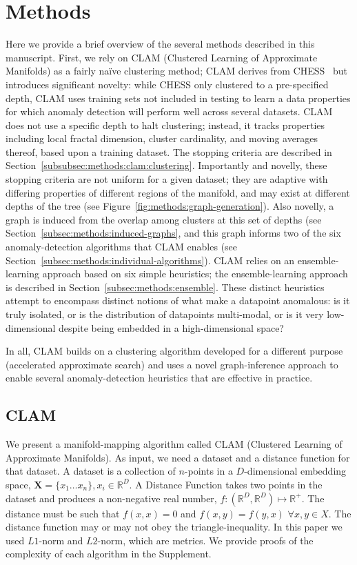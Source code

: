 \section{Methods}
\label{sec:methods}
\label{subsec:methods:overview}

Here we provide a brief overview of the several methods described in this manuscript.
First, we rely on CLAM (Clustered Learning of Approximate Manifolds) as a fairly na\"ive clustering method; CLAM derives from CHESS~\cite{ishaq2019clustered} but introduces significant novelty: while CHESS only clustered to a pre-specified depth, CLAM uses training sets not included in testing to learn a data properties for which anomaly detection will perform well across several datasets.
CLAM does not use a specific depth to halt clustering; instead, it tracks properties including local fractal dimension, cluster cardinality, and moving averages thereof, based upon a training dataset. 
The stopping criteria are described in Section~\ref{subsubsec:methods:clam:clustering}.
Importantly and novelly, these stopping criteria are not uniform for a given dataset; they are adaptive with differing properties of different regions of the manifold, and may exist at different depths of the tree (see Figure~\ref{fig:methods:graph-generation}).
Also novelly, a graph is induced from the overlap among clusters at this set of depths (see Section~\ref{subsec:methods:induced-graphs}, and this graph informs two of the six anomaly-detection algorithms that CLAM enables (see Section~\ref{subsec:methods:individual-algorithms}).
CLAM relies on an ensemble-learning approach based on six simple heuristics; the ensemble-learning approach is described in Section~\ref{subsec:methods:ensemble}.
These distinct heuristics attempt to encompass distinct notions of what make a datapoint anomalous: is it truly isolated, or is the distribution of datapoints multi-modal, or is it very low-dimensional despite being embedded in a high-dimensional space?

In all, CLAM builds on a clustering algorithm developed for a different purpose (accelerated approximate search) and uses a novel graph-inference approach to enable several anomaly-detection heuristics that are effective in practice.


\subsection{CLAM}
\label{subsec:methods:clam}

We present a manifold-mapping algorithm called CLAM (Clustered Learning of Approximate Manifolds).
As input, we need a dataset and a distance function for that dataset.
A dataset is a collection of $n$-points in a $D$-dimensional embedding space, $\textbf{X} = \{x_1 \dots x_n\}, x_i \in \mathbb{R}^D$.
A Distance Function takes two points in the dataset and produces a non-negative real number, $f : (\mathbb{R}^D, \mathbb{R}^D) \mapsto \mathbb{R}^+$.
The distance must be such that $f(x, x) = 0$ and $f(x, y) = f(y, x)$ $\forall x, y \in X$.
The distance function may or may not obey the triangle-inequality.
In this paper we used $L1$-norm and $L2$-norm, which are metrics.
We provide proofs of the complexity of each algorithm in the Supplement.

